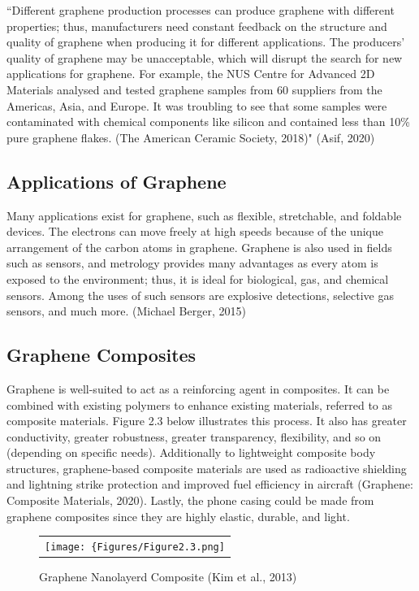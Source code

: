 \documentclass[a4paper,12pt]{article}
\numberwithin{equation}{section}
\numberwithin{figure}{section}
\begin{document}
\noindent ``Different graphene production processes can produce graphene with different properties; thus, manufacturers need constant feedback on the structure and quality of graphene when producing it for different applications. The producers' quality of graphene may be unacceptable, which will disrupt the search for new applications for graphene. For example, the NUS Centre for Advanced 2D Materials analysed and tested graphene samples from 60 suppliers from the Americas, Asia, and Europe. It was troubling to see that some samples were contaminated with chemical components like silicon and contained less than 10\% pure graphene flakes. (The American Ceramic Society, 2018)" (Asif, 2020)

\subsection{Applications of Graphene}

\noindent Many applications exist for graphene, such as flexible, stretchable, and foldable devices. The electrons can move freely at high speeds because of the unique arrangement of the carbon atoms in graphene. Graphene is also used in fields such as sensors, and metrology provides many advantages as every atom is exposed to the environment; thus, it is ideal for biological, gas, and chemical sensors. Among the uses of such sensors are explosive detections, selective gas sensors, and much more. (Michael Berger, 2015)

\subsection{Graphene Composites}

\noindent Graphene is well-suited to act as a reinforcing agent in composites. It can be combined with existing polymers to enhance existing materials, referred to as composite materials. Figure 2.3 below illustrates this process. It also has greater conductivity, greater robustness, greater transparency, flexibility, and so on (depending on specific needs). Additionally to lightweight composite body structures, graphene-based composite materials are used as radioactive shielding and lightning strike protection and improved fuel efficiency in aircraft (Graphene: Composite Materials, 2020). Lastly, the phone casing could be made from graphene composites since they are highly elastic, durable, and light.\vspace{\baselineskip}

\begin{figure}[H]
  \centering
  \begin{tabular}{@{}c@{}}
    \texttt{[image: \{Figures/Figure2.3.png]}} \\
  \end{tabular}
  \caption{Graphene Nanolayerd Composite (Kim et al., 2013)}
\end{figure}
\end{document}
